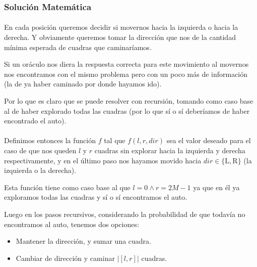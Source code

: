 \documentclass[../main.tex]{subfiles}
\begin{document}
\subsubsection{Solución Matemática}

\paragraph{} En cada posición queremos decidir si movernos hacia la izquierda o hacia la derecha. Y obviamente queremos tomar la dirección que nos de la cantidad mínima esperada de cuadras que caminaríamos.

Si un oráculo nos diera la respuesta correcta para este movimiento al movernos nos encontramos con el mismo problema pero con un poco más de información (la de ya haber caminado por donde hayamos ido).

Por lo que es claro que se puede resolver con recursión, tomando como caso base al de haber explorado todas las cuadras (por lo que sí o sí deberíamos de haber encontrado el auto).

\paragraph{} Definimos entonces la función \(f\) tal que \(f(l, r, dir)\) sea el valor deseado para el caso de que nos queden \(l\) y \(r\) cuadras sin explorar hacia la izquierda y derecha respectivamente, y en el último paso nos hayamos movido hacia \(dir \in \{\text{L}, \text{R}\}\) (la izquierda o la derecha).

Esta función tiene como caso base al que \(l = 0 \land r = 2M-1\) ya que en él ya exploramos todas las cuadras y sí o sí encontramos el auto.

Luego en los pasos recursivos, considerando la probabilidad de que todavía no encontramos al auto, tenemos dos opciones:
\begin{itemize}
  \item Mantener la dirección, y sumar una cuadra.
  \item Cambiar de dirección y caminar \(|[l, r]|\) cuadras.
\end{itemize}
\end{document}
